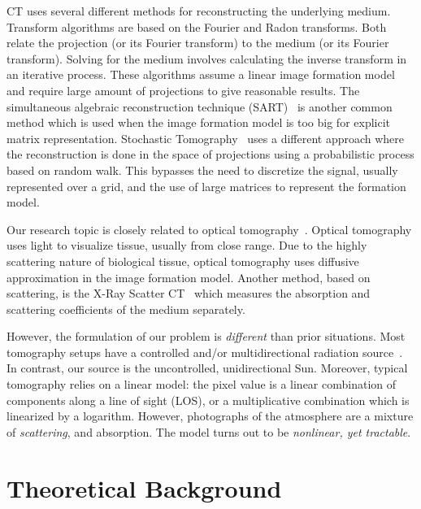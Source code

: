 \documentclass[10pt,letterpaper]{article}
\begin{document}
CT uses several different methods for reconstructing the underlying
medium. Transform algorithms are based on the Fourier and Radon
transforms. Both relate the projection (or its Fourier transform) to
the medium (or its Fourier transform). Solving for the medium involves
calculating the inverse transform in an iterative process.  These
algorithms assume a linear image formation model and require large
amount of projections to give reasonable results. The simultaneous
algebraic reconstruction technique
(SART)~\cite{KakAvinashC.andSlaney2001} is another common method which
is used when the image formation model is too big for explicit matrix
representation. Stochastic Tomography~\cite{gregson} uses a different
approach where the reconstruction is done in the space of projections
using a probabilistic process based on random walk. This bypasses the
need to discretize the signal, usually represented over a grid, and
the use of large matrices to represent the formation model.

Our research topic is closely related to optical
tomography~\cite{Arridge}. Optical tomography uses light to visualize
tissue, usually from close range.  Due to the highly scattering nature
of biological tissue, optical tomography uses diffusive approximation
in the image formation model.  Another method, based on scattering, is
the X-Ray Scatter CT~\cite{Aviles2011} which measures the absorption
and scattering coefficients of the medium separately.
 
However, the formulation of our problem is {\em different} than prior
situations. Most tomography setups have a controlled and/or
multidirectional radiation source~\cite{messer}. In contrast, our
source is the uncontrolled, unidirectional Sun. Moreover, typical
tomography relies on a linear model: the pixel value is a linear
combination of components along a line of sight (LOS), or a
multiplicative combination which is linearized by a logarithm.
However, photographs of the atmosphere are a mixture of {\em
  scattering}, and absorption. The model turns out to be {\em
  nonlinear, yet tractable}.


\section{Theoretical Background}
\label{sec:theor-backgr}
\end{document}
